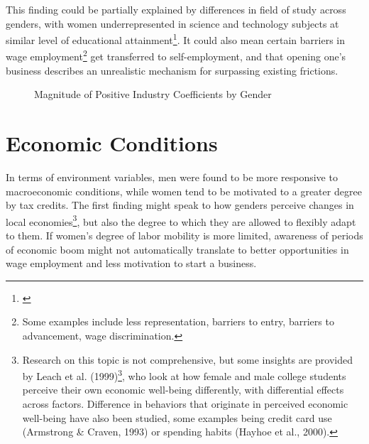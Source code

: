 This finding could be partially explained by differences in field of study across genders, with women underrepresented in science and technology subjects at similar level of educational attainment\footnote{\cite{olivetti2016dp11034}}. It could also mean certain barriers in wage employment\footnote{Some examples include less representation, barriers to entry, barriers to advancement, wage discrimination.} get transferred to self-employment, and that opening one's business describes an unrealistic mechanism for surpassing existing frictions. 

\begin{figure}[hbtp]
    \caption{Magnitude of Positive Industry Coefficients by Gender} 
\end{figure}

\section{Economic Conditions}

In terms of environment variables, men were found to be more responsive to macroeconomic conditions, while women tend to be motivated to a greater degree by tax credits. The first finding might speak to how genders perceive changes in local economies\footnote{Research on this topic is not comprehensive, but some insights are provided by Leach et al. (1999)\footnote{\cite{LeachHayhoeTurner1999}}, who look at how female and male college students perceive their own economic well-being differently, with differential effects across factors. Difference in behaviors that originate in perceived economic well-being have also been studied, some examples being credit card use (Armstrong & Craven, 1993) or spending habits (Hayhoe et al., 2000).}, but also the degree to which they are allowed to flexibly adapt to them. If women's degree of labor mobility is more limited, awareness of periods of economic boom might not automatically translate to better opportunities in wage employment and less motivation to start a business. 

